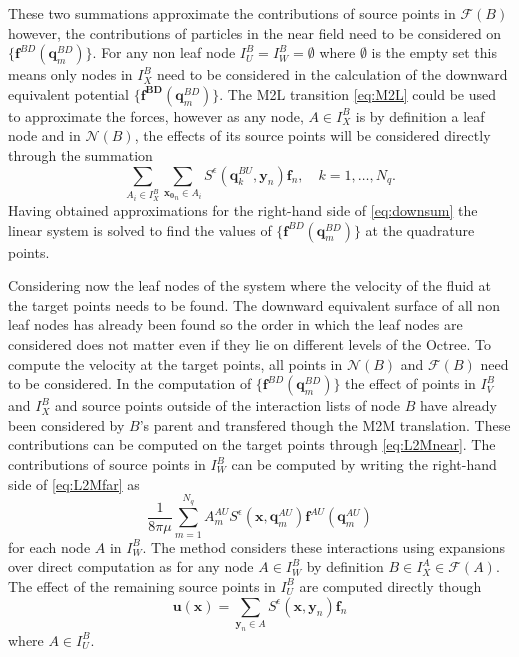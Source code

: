 These two summations approximate the contributions of source points in $\mathcal{F}(B)$ however, the contributions of particles in the near field need to be considered on $\{\bm{f}^{B D}(\bm{q}^{BD}_m)\}$. For any non leaf node $I_U^B = I_W^B = \emptyset$ where $\emptyset$ is the empty set this means only nodes in $I_X^B$ need to be considered in the calculation of the downward equivalent potential $\{\bm{f^{BD}}(\bm{q}^{BD}_m)\}$. The M2L transition \cref{eq:M2L} could be used to approximate the forces, however as any node, $A \in I_X^B$ is by definition a leaf node and in $\mathcal{N}(B)$, the effects of its source points will be considered directly through the summation
\begin{equation}
\label{eq:X}
    \sum_{A_i \in I_X^B} \sum_{{\bm{x_0}}_n\in A_i} S^\epsilon\left(\bm{q}^{BU}_{k}, {\bm{y}}_{n}\right) {\bm{f}}_{n}, \quad k=1,\dots,N_q.
\end{equation}
Having obtained approximations for the right-hand side of \cref{eq:downsum} the linear system is solved to find the values of $\{\bm{f}^{BD}(\bm{q}^{BD}_m)\}$ at the quadrature points.

Considering now the leaf nodes of the system where the velocity of the fluid at the target points needs to be found. The downward equivalent surface of all non leaf nodes has already been found so the order in which the leaf nodes are considered does not matter even if they lie on different levels of the Octree. To compute the velocity at the target points, all points in $\mathcal{N}(B)$ and $\mathcal{F}(B)$ need to be considered. In the computation of $\{\bm{f}^{BD}(\bm{q}^{BD}_m)\}$ the effect of points in $I_V^B$ and $I_X^B$ and source points outside of the interaction lists of node $B$ have already been considered by $B$'s parent and transfered though the M2M translation. These contributions can be computed on the target points through \cref{eq:L2Mnear}. The contributions of source points in $I_W^B$ can be computed by writing the right-hand side of \cref{eq:L2Mfar} as
\begin{equation}
\label{eq:W}
    \frac{1}{8 \pi \mu} \sum_{m=1}^{N_{q}} A_{m}^{AU} S^\epsilon\left(\bm{x}, \bm{q}_{m}^{A U}\right) \bm{f}^{A U}\left(\bm{q}_{m}^{A U}\right)
\end{equation}
for each node $A$ in $I_W^B$. The method considers these interactions using expansions over direct computation as for any node $A \in I_W^B$ by definition $B \in I_X^A \in \mathcal{F}(A)$. The effect of the remaining source points in $I_U^B$ are computed directly though
\begin{equation}
\label{eq:U}
    \bm{u}(\bm{x}) = \sum_{{\bm{y}}_n\in A} S^\epsilon(\bm{x},{\bm{y}}_n){\bm{f}}_n
\end{equation}
where $A \in I_U^B$.

